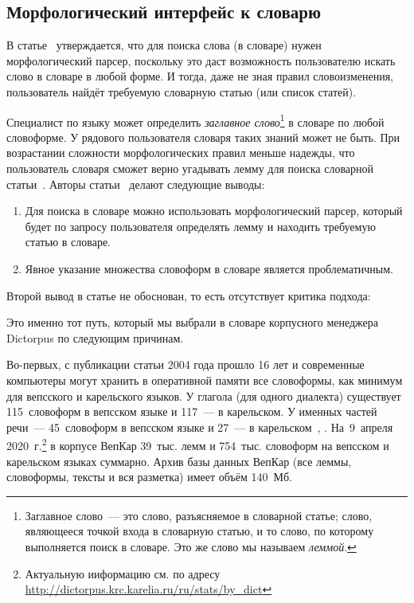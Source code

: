 
\subsection{Морфологический интерфейс к словарю} \label{sect_morpho_API_to_dict}

В статье~\cite[с.~65]{morphoAPI2dict2004Maxwell} утверждается, 
что для поиска слова (в словаре) нужен морфологический парсер, 
поскольку это даст возможность пользователю искать слово в словаре в любой форме. 
И тогда, даже не зная правил словоизменения, пользователь найдёт требуемую словарную статью (или список статей).

Специалист по языку может определить \emph{заглавное слово}\footnote{Заглавное слово~--- это слово, разъясняемое в словарной статье; слово, являющееся точкой входа в словарную статью, и то слово, по которому выполняется поиск в словаре. Это же слово мы называем \emph{леммой}.} в словаре по любой словоформе. У рядового пользователя словаря таких знаний может не быть.
При возрастании сложности морфологических правил меньше надежды, 
что пользователь словаря сможет верно угадывать лемму 
для поиска словарной статьи~\cite[с.~66]{morphoAPI2dict2004Maxwell}. 
Авторы статьи~\cite{morphoAPI2dict2004Maxwell} делают следующие выводы:
\begin{enumerate}
\item Для поиска в словаре можно использовать морфологический парсер, который будет по запросу пользователя определять лемму и находить требуемую статью в словаре.
\item Явное указание множества словоформ в словаре является проблематичным.
\end{enumerate}

\noindent
Второй вывод в статье не обоснован,
то есть отсутствует критика подхода: 


\noindent
Это именно тот путь, который мы выбрали в словаре корпусного менеджера Dictorpus 
по следующим причинам. 

Во-первых, с публикации статьи 2004 года прошло 16 лет и современные компьютеры могут хранить в оперативной памяти все словоформы, как минимум для вепсского и карельского языков. 
У глагола (для одного диалекта) существует 115~словоформ в вепсском языке и 117~--- в карельском. 
У именных частей речи~--- 45~словоформ в вепсском языке и 27~--- в карельском~\cite[с.~415--428]{ZaitsevaNG2012OrphDict}, \cite{NovakPenttonenRuuskanenSiilin2019, Zaikov2000KarGram, ZaitsevaMI1981, ZaitsevaNG1981VepsName, ZaitsevaNG2002VepsVerb}. 
На~9~апреля 2020~г.\footnote{Актуальную ииформацию см. по адресу \url{http://dictorpus.krc.karelia.ru/ru/stats/by_dict}} в корпусе ВепКар 39~тыс. лемм и 754~тыс. словоформ на вепсском и карельском языках суммарно. 
Архив базы данных ВепКар (все леммы, словоформы, тексты и вся разметка) имеет объём 140~Мб.

